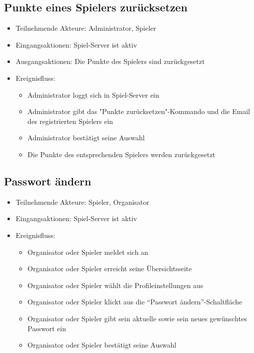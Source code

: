 \documentclass[a4paper]{scrreprt}
\begin{document}
    \subsection{Punkte eines Spielers zurücksetzen}
    \begin{itemize}
        \item Teilnehmende Akteure: \Gls{Administrator}, \Gls{Spieler}
        \item Eingangsaktionen: \Gls{Spiel-Server} ist aktiv
        \item Ausgangsaktionen: Die Punkte des \Gls{Spieler}s sind zurückgesetzt
        \item Ereignisfluss:
        \begin{itemize}
            \item \Gls{Administrator} loggt sich in \Gls{Spiel-Server} ein
            \item \Gls{Administrator} gibt das "Punkte zurücksetzen"-Kommando und die Email des registrierten Spielers ein
            \item \Gls{Administrator} bestätigt seine Auswahl
            \item Die Punkte des entsprechenden \Gls{Spieler}s werden zurückgesetzt
        \end{itemize}
    \end{itemize}




    \subsection{Passwort ändern}
    \begin{itemize}
    \item Teilnehmende Akteure: \Gls{Spieler}, \Gls{Organisator}
    \item Eingangsaktionen: \Gls{Spiel-Server} ist aktiv
    \item Ereignisfluss:
        \begin{itemize}
            \item \Gls{Organisator} oder \Gls{Spieler} meldet sich an
            \item \Gls{Organisator} oder \Gls{Spieler} erreicht seine Übersichtsseite
            \item \Gls{Organisator} oder \Gls{Spieler} wählt die Profileinstellungen aus
            \item \Gls{Organisator} oder \Gls{Spieler} klickt aus die \enquote{Passwort ändern}-Schaltfläche
            \item \Gls{Organisator} oder \Gls{Spieler} gibt sein aktuelle sowie sein neues gewünschtes Passwort ein
            \item \Gls{Organisator} oder \Gls{Spieler} bestätigt seine Auswahl
        \end{itemize}
    \end{itemize}
\end{document}
